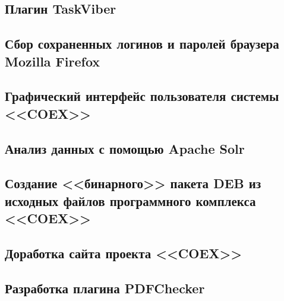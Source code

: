 \newpage
\subsection{Плагин TaskViber}


\newpage
\subsection{ Сбор сохраненных логинов и паролей браузера Mozilla Firefox }



\newpage
\subsection{ Графический интерфейс пользователя системы <<COEX>> }

\newpage
\subsection{ Анализ данных с помощью Apache Solr }

 
\newpage
% 
\subsection {Создание <<бинарного>> пакета DEB из исходных файлов программного комплекса <<COEX>>} 


\newpage 
\subsection{Доработка сайта проекта <<COEX>>}

\newpage
\subsection{Разработка плагина PDFChecker}


\newpage


